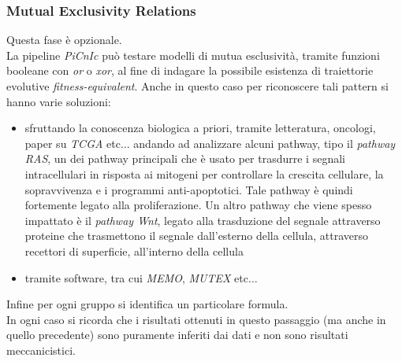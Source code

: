 \documentclass[a4paper,12pt, oneside]{book}
\begin{document}
\subsubsection{Mutual Exclusivity Relations}
Questa fase è opzionale.\\
La pipeline \textit{PiCnIc} può testare modelli di mutua esclusività, tramite
funzioni booleane con \textit{or} o \textit{xor}, al fine di indagare la
possibile esistenza di traiettorie evolutive \textit{fitness-equivalent}. Anche
in questo caso per riconoscere tali pattern si hanno varie soluzioni:
\begin{itemize}
  \item sfruttando la conoscenza biologica a priori, tramite letteratura,
  oncologi, paper su \textit{TCGA} etc$\ldots$ andando ad analizzare alcuni
  pathway, tipo il \textit{pathway RAS}, un dei pathway principali che è usato
  per trasdurre i segnali intracellulari in risposta ai mitogeni per controllare
  la crescita cellulare, la sopravvivenza e i programmi anti-apoptotici. Tale
  pathway è quindi fortemente legato alla proliferazione. Un altro pathway che
  viene spesso impattato è il \textit{pathway Wnt}, legato alla trasduzione del
  segnale attraverso proteine che trasmettono il segnale dall'esterno della
  cellula, attraverso recettori di superficie, all'interno della cellula 
  \item tramite software, tra cui \textit{MEMO}, \textit{MUTEX} etc$\ldots$
\end{itemize}
Infine per ogni gruppo si identifica un particolare formula.\\
In ogni caso si ricorda che i risultati ottenuti in questo passaggio (ma anche
in quello precedente) sono puramente inferiti dai dati e non sono risultati
meccanicistici.
\end{document}
